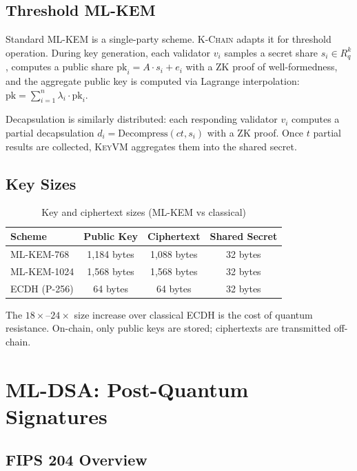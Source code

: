 \documentclass[11pt,letterpaper]{article}
\theoremstyle{definition}
\theoremstyle{remark}
\newcommand{\KChain}{\textsc{K-Chain}}
\newcommand{\KeyVM}{\textsc{KeyVM}}
\begin{document}
\subsection{Threshold ML-KEM}

Standard ML-KEM is a single-party scheme. \KChain{} adapts it for threshold operation. During key generation, each validator $v_i$ samples a secret share $s_i \in R_q^k$, computes a public share $\text{pk}_i = A \cdot s_i + e_i$ with a ZK proof of well-formedness, and the aggregate public key is computed via Lagrange interpolation: $\text{pk} = \sum_{i=1}^{n} \lambda_i \cdot \text{pk}_i$.

Decapsulation is similarly distributed: each responding validator $v_i$ computes a partial decapsulation $d_i = \text{Decompress}(ct, s_i)$ with a ZK proof. Once $t$ partial results are collected, \KeyVM{} aggregates them into the shared secret.

\subsection{Key Sizes}

\begin{table}[h]
\centering
\begin{tabular}{lccc}
\toprule
\textbf{Scheme} & \textbf{Public Key} & \textbf{Ciphertext} & \textbf{Shared Secret} \\
\midrule
ML-KEM-768 & 1,184 bytes & 1,088 bytes & 32 bytes \\
ML-KEM-1024 & 1,568 bytes & 1,568 bytes & 32 bytes \\
ECDH (P-256) & 64 bytes & 64 bytes & 32 bytes \\
\bottomrule
\end{tabular}
\caption{Key and ciphertext sizes (ML-KEM vs classical)}
\label{tab:kem-sizes}
\end{table}

The $18\times$--$24\times$ size increase over classical ECDH is the cost of quantum resistance. On-chain, only public keys are stored; ciphertexts are transmitted off-chain.

\section{ML-DSA: Post-Quantum Signatures}

\subsection{FIPS 204 Overview}
\end{document}
